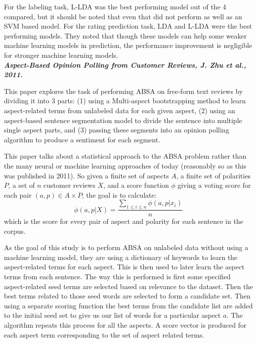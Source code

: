 \documentclass[conference]{IEEEtran}
\begin{document}
For the labeling task, L-LDA was the best performing model out of the 4 compared, but it should be noted that even that did not perform as well as an SVM based model. For the rating prediction task, LDA and L-LDA were the best performing models. They noted that though these models can help some weaker machine learning models in prediction, the performance improvement is negligible for stronger machine learning models.\\

\textit{\textbf{Aspect-Based Opinion Polling
from Customer Reviews, J. Zhu et al., 2011.}}

This paper explores the task of performing ABSA on free-form text reviews by dividing it into 3 parts: (1) using a Multi-aspect bootstrapping method to learn aspect-related terms from unlabeled data for each given aspect, (2) using an aspect-based sentence segmentation model to divide the sentence into multiple single aspect parts, and (3) passing these segments into an opinion polling algorithm to produce a sentiment for each segment.

This paper talks about a statistical approach to the ABSA problem rather than the many neural or machine learning approaches of today (reasonably so as this was published in 2011). So given a finite set of aspects $A$, a finite set of polarities $P$, a set of $n$ customer reviews $X$, and a score function $\phi$ giving a voting score for each pair $(a,p) \in A \times P$; the goal is to calculate:
\begin{equation*}
  \phi (a,p|X) = \frac{\sum_{1 \leq i \leq n} \phi (a,p|x_i)}{n}
\end{equation*}
which is the score for every pair of aspect and polarity for each sentence in the corpus.

As the goal of this study is to perform ABSA on unlabeled data without using a machine learning model, they are using a dictionary of keywords to learn the aspect-related terms for each aspect. This is then used to later learn the aspect terms from each sentence. The way this is performed is first some specified aspect-related seed terms are selected based on relevance to the dataset. Then the best terms related to those seed words are selected to form a candidate set. Then using a separate scoring function the best terms from the candidate list are added to the initial seed set to give us our list of words for a particular aspect $a$. The algorithm repeats this process for all the aspects. A score vector is produced for each aspect term corresponding to the set of aspect related terms.
\end{document}
